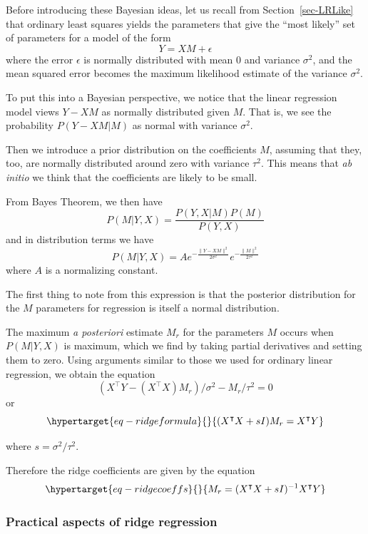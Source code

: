 \documentclass[
  11pt,
  letterpaper,
]{scrbook}
\theoremstyle{plain}
\theoremstyle{remark}
\begin{document}
Before introducing these Bayesian ideas, let us recall from
Section~\ref{sec-LRLike} that ordinary least squares yields the
parameters that give the ``most likely'' set of parameters for a model
of the form \[
Y=XM + \epsilon
\] where the error \(\epsilon\) is normally distributed with mean \(0\)
and variance \(\sigma^2\), and the mean squared error becomes the
maximum likelihood estimate of the variance \(\sigma^2\).

To put this into a Bayesian perspective, we notice that the linear
regression model views \(Y-XM\) as normally distributed given \(M\).
That is, we see the probability \(P(Y-XM|M)\) as normal with variance
\(\sigma^2\).

Then we introduce a prior distribution on the coefficients \(M\),
assuming that they, too, are normally distributed around zero with
variance \(\tau^2\). This means that \emph{ab initio} we think that the
coefficients are likely to be small.

From Bayes Theorem, we then have \[
P(M|Y,X) = \frac{P(Y,X|M)P(M)}{P(Y,X)}
\] and in distribution terms we have \[
P(M|Y,X) = A e^{-\frac{\|Y-XM\|^2}{2\sigma^2}} e^{-\frac{\|M\|^2}{2\tau^{2}}}
\] where \(A\) is a normalizing constant.

The first thing to note from this expression is that the posterior
distribution for the \(M\) parameters for regression is itself a normal
distribution.

The maximum \emph{a posteriori} estimate \(M_{r}\) for the parameters
\(M\) occurs when \(P(M|Y,X)\) is maximum, which we find by taking
partial derivatives and setting them to zero. Using arguments similar to
those we used for ordinary linear regression, we obtain the equation \[
(X^{\intercal}Y-(X^{\intercal}X)M_r)/\sigma^2-M_r/\tau^{2}=0
\] or \begin{equation}\protect\hypertarget{eq-ridgeformula}{}{
(X^{\intercal}X+sI)M_r=X^{\intercal}Y
}\label{eq-ridgeformula}\end{equation}

where \(s=\sigma^2/\tau^2\).

Therefore the ridge coefficients are given by the equation
\begin{equation}\protect\hypertarget{eq-ridgecoeffs}{}{
M_{r}=(X^{\intercal}X+sI)^{-1}X^{\intercal}Y
}\label{eq-ridgecoeffs}\end{equation}

\hypertarget{practical-aspects-of-ridge-regression}{%
\subsubsection{Practical aspects of ridge
regression}\label{practical-aspects-of-ridge-regression}}
\end{document}

